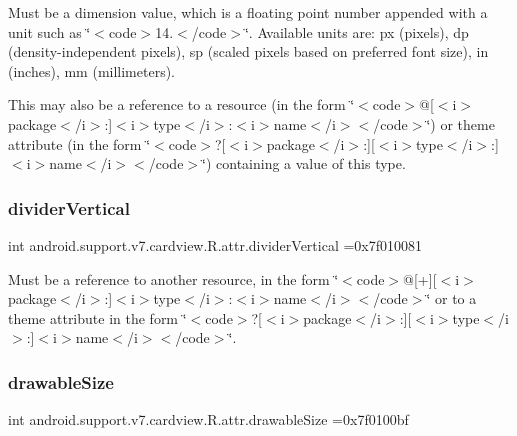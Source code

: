 Must be a dimension value, which is a floating point number appended with a unit such as \char`\"{}$<$code$>$14.\+5sp$<$/code$>$\char`\"{}. Available units are\+: px (pixels), dp (density-\/independent pixels), sp (scaled pixels based on preferred font size), in (inches), mm (millimeters). 

This may also be a reference to a resource (in the form \char`\"{}$<$code$>$@\mbox{[}$<$i$>$package$<$/i$>$\+:\mbox{]}$<$i$>$type$<$/i$>$\+:$<$i$>$name$<$/i$>$$<$/code$>$\char`\"{}) or theme attribute (in the form \char`\"{}$<$code$>$?\mbox{[}$<$i$>$package$<$/i$>$\+:\mbox{]}\mbox{[}$<$i$>$type$<$/i$>$\+:\mbox{]}$<$i$>$name$<$/i$>$$<$/code$>$\char`\"{}) containing a value of this type. \mbox{\label{classandroid_1_1support_1_1v7_1_1cardview_1_1R_1_1attr_a2909e331e64b74973dbf1b900fdc882a}} 
\subsubsection{\texorpdfstring{divider\+Vertical}{dividerVertical}}
{\footnotesize\ttfamily int android.\+support.\+v7.\+cardview.\+R.\+attr.\+divider\+Vertical =0x7f010081\hspace{0.3cm}{\ttfamily [static]}}

Must be a reference to another resource, in the form \char`\"{}$<$code$>$@\mbox{[}+\mbox{]}\mbox{[}$<$i$>$package$<$/i$>$\+:\mbox{]}$<$i$>$type$<$/i$>$\+:$<$i$>$name$<$/i$>$$<$/code$>$\char`\"{} or to a theme attribute in the form \char`\"{}$<$code$>$?\mbox{[}$<$i$>$package$<$/i$>$\+:\mbox{]}\mbox{[}$<$i$>$type$<$/i$>$\+:\mbox{]}$<$i$>$name$<$/i$>$$<$/code$>$\char`\"{}. \mbox{\label{classandroid_1_1support_1_1v7_1_1cardview_1_1R_1_1attr_a1156b8c69ce20341c6ffdec0e8f148f6}} 
\subsubsection{\texorpdfstring{drawable\+Size}{drawableSize}}
{\footnotesize\ttfamily int android.\+support.\+v7.\+cardview.\+R.\+attr.\+drawable\+Size =0x7f0100bf\hspace{0.3cm}{\ttfamily [static]}}

